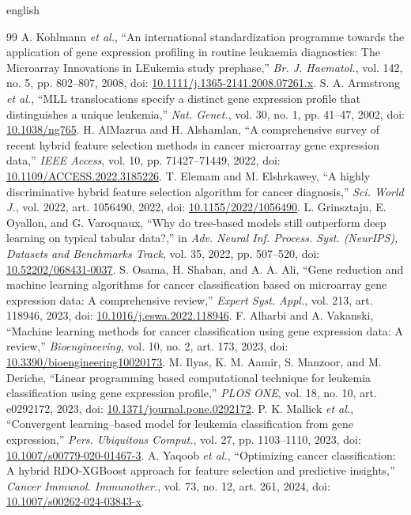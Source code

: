 \documentclass[conference]{IEEEtran}
\begin{document}
\begin{hyphenrules}{english}
\begin{thebibliography}{99}
 A. Kohlmann \textit{et al.}, ``An international standardization programme towards the application of gene expression profiling in routine leukaemia diagnostics: The Microarray Innovations in LEukemia study prephase,'' \textit{Br. J. Haematol.}, vol. 142, no. 5, pp. 802--807, 2008, doi: \url{10.1111/j.1365-2141.2008.07261.x}.
 S. A. Armstrong \textit{et al.}, ``MLL translocations specify a distinct gene expression profile that distinguishes a unique leukemia,'' \textit{Nat. Genet.}, vol. 30, no. 1, pp. 41--47, 2002, doi: \url{10.1038/ng765}.
 H. AlMazrua and H. Alshamlan, ``A comprehensive survey of recent hybrid feature selection methods in cancer microarray gene expression data,'' \textit{IEEE Access}, vol. 10, pp. 71427--71449, 2022, doi: \url{10.1109/ACCESS.2022.3185226}.
 T. Elemam and M. Elshrkawey, ``A highly discriminative hybrid feature selection algorithm for cancer diagnosis,'' \textit{Sci. World J.}, vol. 2022, art. 1056490, 2022, doi: \url{10.1155/2022/1056490}.
 L. Grinsztajn, E. Oyallon, and G. Varoquaux, ``Why do tree-based models still outperform deep learning on typical tabular data?,'' in \textit{Adv. Neural Inf. Process. Syst. (NeurIPS), Datasets and Benchmarks Track}, vol. 35, 2022, pp. 507--520, doi: \url{10.52202/068431-0037}.
 S. Osama, H. Shaban, and A. A. Ali, ``Gene reduction and machine learning algorithms for cancer classification based on microarray gene expression data: A comprehensive review,'' \textit{Expert Syst. Appl.}, vol. 213, art. 118946, 2023, doi: \url{10.1016/j.eswa.2022.118946}.
 F. Alharbi and A. Vakanski, ``Machine learning methods for cancer classification using gene expression data: A review,'' \textit{Bioengineering}, vol. 10, no. 2, art. 173, 2023, doi: \url{10.3390/bioengineering10020173}.
 M. Ilyas, K. M. Aamir, S. Manzoor, and M. Deriche, ``Linear programming based computational technique for leukemia classification using gene expression profile,'' \textit{PLOS ONE}, vol. 18, no. 10, art. e0292172, 2023, doi: \url{10.1371/journal.pone.0292172}.
 P. K. Mallick \textit{et al.}, ``Convergent learning--based model for leukemia classification from gene expression,'' \textit{Pers. Ubiquitous Comput.}, vol. 27, pp. 1103--1110, 2023, doi: \url{10.1007/s00779-020-01467-3}.
 A. Yaqoob \textit{et al.}, ``Optimizing cancer classification: A hybrid RDO-XGBoost approach for feature selection and predictive insights,'' \textit{Cancer Immunol. Immunother.}, vol. 73, no. 12, art. 261, 2024, doi: \url{10.1007/s00262-024-03843-x}.

\end{thebibliography}
\end{hyphenrules}
\end{document}
